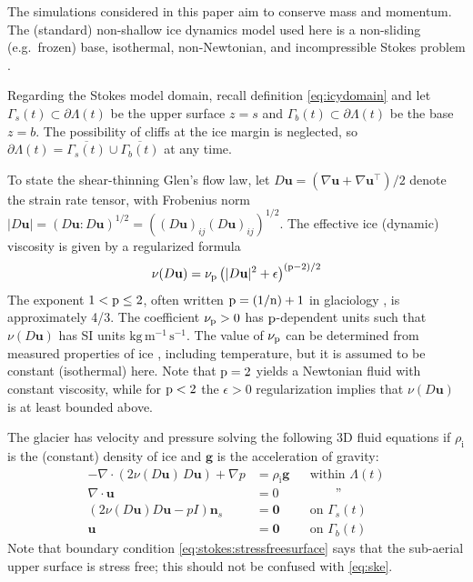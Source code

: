 \documentclass[hidelinks,onefignum,onetabnum,final]{siamart220329}  %
\newcommand{\eps}{\epsilon}
\newcommand{\grad}{\nabla}
\newcommand{\bg}{\mathbf{g}}
\newcommand{\bn}{\mathbf{n}}
\newcommand{\bu}{\mathbf{u}}
\newcommand{\bzero}{\bm{0}}
\newcommand{\nn}{{\text{\textnormal{n}}}}
\newcommand{\pp}{{\text{\textnormal{p}}}}
\newcommand{\rhoi}{\rho_{\text{i}}}
\begin{document}
The simulations considered in this paper aim to conserve mass and momentum.   The (standard) non-shallow ice dynamics model used here is a non-sliding (e.g.~frozen) base, isothermal, non-Newtonian, and incompressible Stokes problem \cite{GreveBlatter2009,JouvetRappaz2011,SchoofHewitt2013}.

Regarding the Stokes model domain, recall definition \eqref{eq:icydomain} and let $\Gamma_s(t) \subset \partial \Lambda(t)$ be the upper surface $z=s$ and $\Gamma_b(t) \subset \partial \Lambda(t)$ be the base $z=b$.  The possibility of cliffs at the ice margin is neglected, so $\partial \Lambda(t) = \overline{\Gamma_s(t)} \cup \overline{\Gamma_b(t)}$ at any time.

To state the shear-thinning Glen's flow law, let $D\bu=(\grad \bu + \grad \bu^{\top})/2$ denote the strain rate tensor, with Frobenius norm $|D\bu| = (D\bu:D\bu)^{1/2} = \left((D\bu)_{ij} (D\bu)_{ij}\right)^{1/2}$.  The effective ice (dynamic) viscosity \cite{GreveBlatter2009} is given by a regularized formula
\begin{equation}
\nu(D\bu) = \nu_\pp \left(|D\bu|^2 + \eps\right)^{(\pp-2)/2} \label{eq:glen}
\end{equation}
The exponent $1 < \pp \le 2$, often written $\pp=(1/\nn)+1$ in glaciology \cite{GoldsbyKohlstedt2001}, is approximately 4/3.  The coefficient $\nu_\pp>0$ has $\pp$-dependent units such that $\nu(D\bu)$ has SI units $\text{kg}\,\text{m}^{-1}\,\text{s}^{-1}$.  The value of $\nu_\pp$ can be determined from measured properties of ice \cite{GreveBlatter2009}, including temperature, but it is assumed to be constant (isothermal) here.  Note that $\pp=2$ yields a Newtonian fluid with constant viscosity, while for $\pp < 2$ the $\eps>0$ regularization implies that $\nu(D\bu)$ is at least bounded above.

The glacier has velocity and pressure solving the following 3D fluid equations if $\rhoi$ is the (constant) density of ice and $\bg$ is the acceleration of gravity:
\begin{subequations}
\label{eq:stokes}
\begin{align}
- \nabla \cdot \left(2 \nu(D\bu)\, D\bu\right) + \nabla p &= \rhoi \bg && \text{within $\Lambda(t)$} \\
\nabla \cdot \bu &= 0 && \qquad \text{''} \label{eq:stokes:incomp} \\
\left(2 \nu(D\bu) D\bu - pI\right) \bn_s &= \bzero && \text{on $\Gamma_s(t)$}\label{eq:stokes:stressfreesurface} \\
\bu  &= \bzero && \text{on $\Gamma_b(t)$}
\end{align}
\end{subequations}
Note that boundary condition \eqref{eq:stokes:stressfreesurface} says that the sub-aerial upper surface is stress free; this should not be confused with \eqref{eq:ske}.
\end{document}
